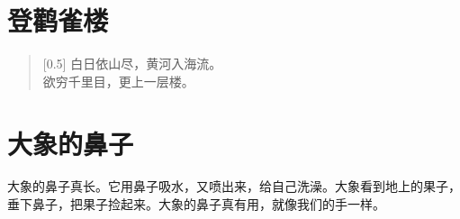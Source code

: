 \documentclass[12pt,UTF-8,openany]{ctexbook}
\begin{document}
\hanzibox{}\hanzibox{}\hanzibox{}\hanzibox{}\hspace{1em}




\chapter{登鹳雀楼}

\begin{large}
    
    \begin{verse}[0.5\linewidth]
        白日依山尽，黄河入海流。 \\
        欲穷千里目，更上一层楼。
    \end{verse}
    
\end{large}


\clearpage

\begin{center}
    
\end{center}


\hanzibox{}\hanzibox{}\hanzibox{}\hanzibox{}\hspace{1em}\hanzibox{}\hanzibox{}\hanzibox{}\hanzibox{}

\hanzibox{}\hanzibox{}\hanzibox{}\hanzibox{}\hspace{1em}\hanzibox{}\hanzibox{}\hanzibox{}\hanzibox{}

\hanzibox{}\hanzibox{}\hanzibox{}\hanzibox{}\hspace{1em}\hanzibox{}\hanzibox{}\hanzibox{}\hanzibox{}






\chapter{大象的鼻子}

\begin{large}
    
    大象的鼻子真长。它用鼻子吸水，又喷出来，给自己洗澡。大象看到地上的果子，垂下鼻子，把果子捡起来。大象的鼻子真有用，就像我们的手一样。
    
\end{large}


\clearpage
\end{document}
